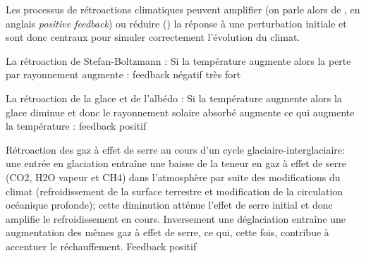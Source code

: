 
Les processus de rétroactions climatiques peuvent amplifier (on parle alors de , en anglais \emph{positive feedback}) ou réduire () la réponse à une perturbation initiale et sont donc centraux pour simuler correctement l’évolution du climat.

\begin{finger}
\item La rétroaction de Stefan-Boltzmann : Si la température augmente alors la perte par rayonnement augmente : feedback négatif très fort
\item La rétroaction de la glace et de l’albédo : Si la température augmente alors la glace diminue et donc le rayonnement solaire absorbé augmente ce qui augmente la température : feedback positif
\item Rétroaction des gaz à effet de serre au cours d’un cycle glaciaire-interglaciaire: une entrée en glaciation entraîne une baisse de la teneur en gaz à effet de serre (CO2, H2O vapeur et CH4) dans l'atmosphère par suite des modifications du climat (refroidissement de la surface terrestre et modification de la circulation océanique profonde); cette diminution atténue l'effet de serre initial et donc amplifie le refroidissement en cours. Inversement une déglaciation entraîne une augmentation des mêmes gaz à effet de serre, ce qui, cette fois, contribue à accentuer le réchauffement. Feedback positif
\end{finger}

